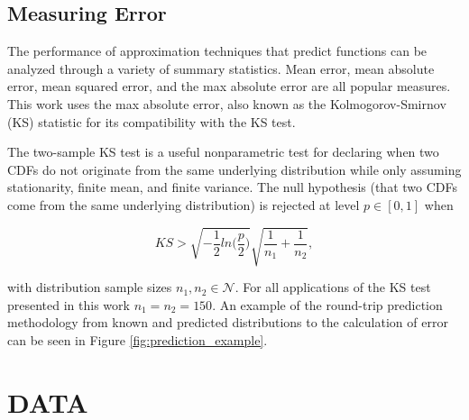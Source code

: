 \documentclass[letterpaper, 10 pt, conference]{ieeeconf}  %
\begin{document}
\subsection{Measuring Error}

The performance of approximation techniques that predict functions can be analyzed through a variety of summary statistics. Mean error, mean absolute error, mean squared error, and the max absolute error are all popular measures. This work uses the max absolute error, also known as the Kolmogorov-Smirnov (KS) statistic \cite{lilliefors1967kolmogorov} for its compatibility with the KS test.

The two-sample KS test is a useful nonparametric test for declaring when two CDFs do not originate from the same underlying distribution while only assuming stationarity, finite mean, and finite variance. The null hypothesis (that two CDFs come from the same underlying distribution) is rejected at level $p \in [0,1]$ when

$$ KS > \sqrt{-\frac{1}{2}ln\big(\frac{p}{2}\big)} \sqrt{\frac{1}{n_1} + \frac{1}{n_2}}, $$

with distribution sample sizes $n_1,n_2 \in \mathcal{N}$. For all applications of the KS test presented in this work $n_1 = n_2 = 150$. An example of the round-trip prediction methodology from known and predicted distributions to the calculation of error can be seen in Figure \ref{fig:prediction_example}.


\section{DATA}
\label{sec:data}
\end{document}

